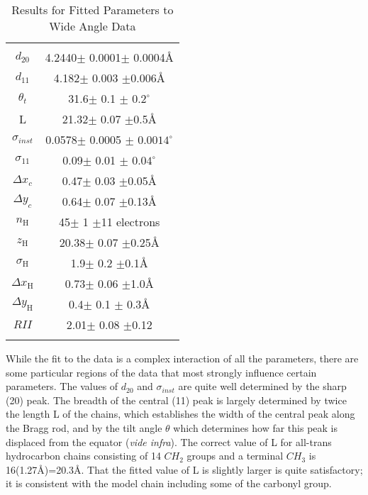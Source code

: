 \begin{table}
\caption{Results for Fitted Parameters to Wide Angle Data
\label{table1}}
\begin{center}
\begin{tabular}{cc}
\hline \hline \\
$d_{20}$                        & 4.2440$\pm$ 0.0001$\pm$ 0.0004\AA\\
$d_{11}$                        & 4.182$\pm$ 0.003 $\pm$0.006\AA\\
${\theta}_{t}$                  & 31.6$\pm$ 0.1 $\pm$ $0.2^{\circ}$\\
L                               & 21.32$\pm$ 0.07 $\pm$0.5\AA\\
${\sigma}_{inst}$               & 0.0578$\pm$ 0.0005 $\pm$ $0.0014^{\circ}$\\
${\sigma}_{11}$                 & 0.09$\pm$ 0.01 $\pm$ $0.04^{\circ}$\\
${\Delta x}_{c}$                & 0.47$\pm$ 0.03 $\pm$0.05\AA\\
${\Delta y}_{c}$                & 0.64$\pm$ 0.07 $\pm$0.13\AA\\
$n_{\mbox{H}}$                  & 45$\pm$ 1 $\pm$11 electrons\\
$z_{\mbox{H}}$                  & 20.38$\pm$ 0.07 $\pm$0.25\AA\\
${\sigma}_{\mbox{H}}$           & 1.9$\pm$ 0.2 $\pm$0.1\AA\\
${\Delta x}_{\mbox{H}}$         & 0.73$\pm$ 0.06 $\pm$1.0\AA\\
${\Delta y}_{\mbox{H}}$         & 0.4$\pm$ 0.1 $\pm$ 0.3\AA\\
$RII$                           & 2.01$\pm$ 0.08 $\pm$0.12\\
\hline \hline \\
\end{tabular}
\end{center}
\end{table}

While the fit to the data is a complex interaction of all the parameters,
there are some particular regions of the data that most strongly
influence certain parameters. The values of $d_{20}$ and ${\sigma}_{inst}$ 
are quite well determined by the sharp (20) peak.
The breadth of the central (11) peak is largely determined by twice the length
L of the chains, which establishes the width of the central peak along
the Bragg rod, and by the tilt angle $\theta$ which determines how
far this peak is displaced from the equator ({\it vide infra}).  
The correct value of L for all-trans hydrocarbon
chains consisting of 14 $CH_{2}$ groups and a terminal $CH_{3}$ is
16(1.27\AA )=20.3\AA. That the fitted value of L is slightly
larger is quite satisfactory; it is consistent with the model chain including
some of the carbonyl group.

